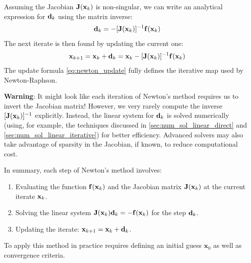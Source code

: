 Assuming the Jacobian $\mathbf{J}(\mathbf{x}_k)$ is non-singular, we can write an analytical expression for $\mathbf{d}_k$ using the matrix inverse:
\begin{equation}
    \mathbf{d}_k = -[\mathbf{J}(\mathbf{x}_k)]^{-1} \mathbf{f}(\mathbf{x}_k)
\end{equation}
The next iterate is then found by updating the current one:
\begin{equation}
	\label{eq:newton_update}
    \mathbf{x}_{k+1} = \mathbf{x}_k + \mathbf{d}_k = \mathbf{x}_k - [\mathbf{J}(\mathbf{x}_k)]^{-1} \mathbf{f}(\mathbf{x}_k)
\end{equation}
The update formula \autoref{eq:newton_update} fully defines the iterative map used by Newton-Raphson. 

\begin{warningBox}
    \textbf{Warning}: It might look like each iteration of Newton's method requires us to invert the Jacobian matrix! However, we very rarely compute the inverse $[\mathbf{J}(\mathbf{x}_k)]^{-1}$ explicitly. Instead, the linear system for $\mathbf{d}_k$ is solved numerically (using, for example, the techniques discussed in \autoref{sec:num_sol_linear_direct} and \autoref{sec:num_sol_linear_iterative}) for better efficiency. Advanced solvers may also take advantage of sparsity in the Jacobian, if known, to reduce computational cost.
\end{warningBox}

In summary, each step of Newton's method involves:
\begin{enumerate}
    \item Evaluating the function $\mathbf{f}(\mathbf{x}_k)$ and the Jacobian matrix $\mathbf{J}(\mathbf{x}_k)$ at the current iterate $\mathbf{x}_k$.
    \item Solving the linear system $\mathbf{J}(\mathbf{x}_k)\mathbf{d}_k = -\mathbf{f}(\mathbf{x}_k)$ for the step $\mathbf{d}_k$.
    \item Updating the iterate: $\mathbf{x}_{k+1} = \mathbf{x}_k + \mathbf{d}_k$.
\end{enumerate}
To apply this method in practice requires defining an initial guess $\mathbf x_0$ as well as convergence criteria.


